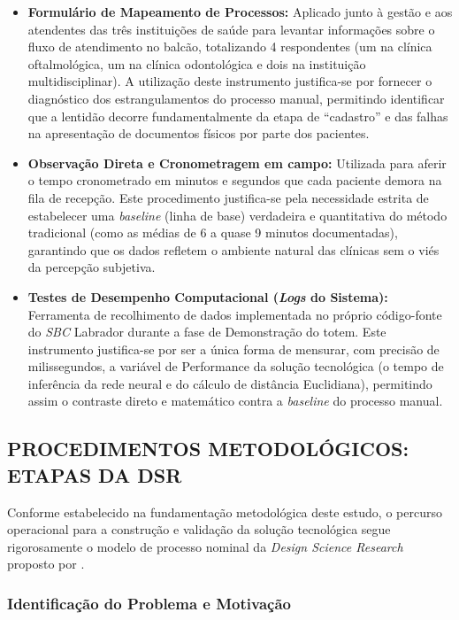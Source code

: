 \begin{itemize}
    \item \textbf{Formulário de Mapeamento de Processos:} Aplicado junto à gestão e aos atendentes das três instituições de saúde para levantar informações sobre o fluxo de atendimento no balcão, totalizando 4 respondentes (um na clínica oftalmológica, um na clínica odontológica e dois na instituição multidisciplinar). A utilização deste instrumento justifica-se por fornecer o diagnóstico dos estrangulamentos do processo manual, permitindo identificar que a lentidão decorre fundamentalmente da etapa de ``cadastro'' e das falhas na apresentação de documentos físicos por parte dos pacientes.
    \item \textbf{Observação Direta e Cronometragem em campo:} Utilizada para aferir o tempo cronometrado em minutos e segundos que cada paciente demora na fila de recepção. Este procedimento justifica-se pela necessidade estrita de estabelecer uma \textit{baseline} (linha de base) verdadeira e quantitativa do método tradicional (como as médias de 6 a quase 9 minutos documentadas), garantindo que os dados refletem o ambiente natural das clínicas sem o viés da percepção subjetiva.
    \item \textbf{Testes de Desempenho Computacional (\textit{Logs} do Sistema):} Ferramenta de recolhimento de dados implementada no próprio código-fonte do \textit{SBC} Labrador durante a fase de Demonstração do totem. Este instrumento justifica-se por ser a única forma de mensurar, com precisão de milissegundos, a variável de Performance da solução tecnológica (o tempo de inferência da rede neural e do cálculo de distância Euclidiana), permitindo assim o contraste direto e matemático contra a \textit{baseline} do processo manual.
\end{itemize}

\subsection{PROCEDIMENTOS METODOLÓGICOS: ETAPAS DA DSR}
\label{subsec:estapas-dsr}

Conforme estabelecido na fundamentação metodológica deste estudo, o percurso operacional para a construção e validação da solução tecnológica segue rigorosamente o modelo de processo nominal da \textit{Design Science Research} proposto por \cite{peffers2007design}.

\subsubsection{Identificação do Problema e Motivação}
\label{subsubsec:problema-motivacao}

